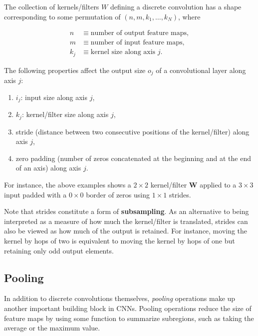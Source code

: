 \documentclass[%
oneside,                 %
final,                   %
10pt]{article}
\begin{document}
The collection of kernels/filters $W$ defining a discrete convolution has a shape
corresponding to some permutation of $(n, m, k_1, \ldots, k_N)$, where

\begin{equation*}
\begin{split}
    n &\equiv \text{number of output feature maps},\\
    m &\equiv \text{number of input feature maps},\\
    k_j &\equiv \text{kernel size along axis $j$}.
\end{split}
\end{equation*}

The following properties affect the output size $o_j$ of a convolutional layer
along axis $j$:

\begin{enumerate}
\item $i_j$: input size along axis $j$,

\item $k_j$: kernel/filter size along axis $j$,

\item stride (distance between two consecutive positions of the kernel/filter) along axis $j$,

\item zero padding (number of zeros concatenated at the beginning and at the end of an axis) along axis $j$.
\end{enumerate}

\noindent
For instance, the above examples shows a  $2\times 2$ kernel/filter $\bm{W}$  applied to a $3 \times 3$ input padded with a $0 \times 0$
border of zeros using $1 \times 1$ strides.

Note that strides constitute a form of \textbf{subsampling}. As an alternative to
being interpreted as a measure of how much the kernel/filter is translated, strides
can also be viewed as how much of the output is retained. For instance, moving
the kernel by hops of two is equivalent to moving the kernel by hops of one but
retaining only odd output elements.

\subsection*{Pooling}

In addition to discrete convolutions themselves, {\em pooling\/} operations
make up another important building block in CNNs. Pooling operations reduce
the size of feature maps by using some function to summarize subregions, such
as taking the average or the maximum value.
\end{document}

